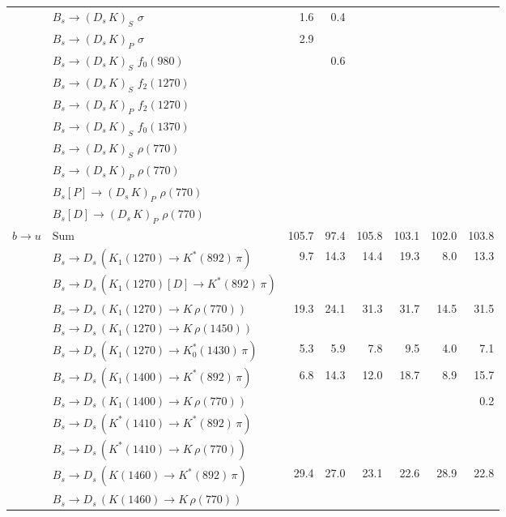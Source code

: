 \begin{tabular}{l l  r  r  r  r  r  r  }
 & $B_s \to ( D_s \, K)_{S} \, \, \sigma$ & 1.6 & 0.4 &  &  &  &  \\ 
 & $B_s \to ( D_s \, K)_{P} \, \, \sigma$ & 2.9 &  &  &  &  &  \\ 
 & $B_s \to ( D_s \, K)_{S} \, \, f_0(980)$ &  & 0.6 &  &  &  &  \\ 
 & $B_s \to ( D_s \, K)_{S} \, \, f_2(1270)$ &  &  &  &  &  &  \\ 
 & $B_s \to ( D_s \, K)_{P} \, \, f_2(1270)$ &  &  &  &  &  &  \\ 
 & $B_s \to ( D_s \, K)_{S} \, \, f_0(1370)$ &  &  &  &  &  &  \\ 
 & $B_s \to ( D_s \, K)_{S} \, \, \rho(770)$ &  &  &  &  &  &  \\ 
 & $B_s \to ( D_s \, K)_{P} \, \, \rho(770)$ &  &  &  &  &  &  \\ 
 & $B_s[P] \to ( D_s \, K)_{P} \, \, \rho(770)$ &  &  &  &  &  &  \\ 
 & $B_s[D] \to ( D_s \, K)_{P} \, \, \rho(770)$ &  &  &  &  &  &  \\ 
\multirow{30}{*}{$b \to u$}  & $\text{Sum}$ & 105.7 & 97.4 & 105.8 & 103.1 & 102.0 & 103.8 \\ 
\hline
 & $B_s \to D_s \, ( K_1(1270) \to K^{*}(892) \, \pi )$ & 9.7 & 14.3 & 14.4 & 19.3 & 8.0 & 13.3 \\ 
 & $B_s \to D_s \, ( K_1(1270)[D] \to K^{*}(892) \, \pi )$ &  &  &  &  &  &  \\ 
 & $B_s \to D_s \, ( K_1(1270) \to K \, \rho(770) )$ & 19.3 & 24.1 & 31.3 & 31.7 & 14.5 & 31.5 \\ 
 & $B_s \to D_s \, ( K_1(1270) \to K \, \rho(1450) )$ &  &  &  &  &  &  \\ 
 & $B_s \to D_s \, ( K_1(1270) \to K^{*}_{0}(1430) \, \pi )$ & 5.3 & 5.9 & 7.8 & 9.5 & 4.0 & 7.1 \\ 
 & $B_s \to D_s \, ( K_1(1400) \to K^{*}(892) \, \pi )$ & 6.8 & 14.3 & 12.0 & 18.7 & 8.9 & 15.7 \\ 
 & $B_s \to D_s \, ( K_1(1400) \to K \, \rho(770) )$ &  &  &  &  &  & 0.2 \\ 
 & $B_s \to D_s \, ( K^{*}(1410) \to K^{*}(892) \, \pi )$ &  &  &  &  &  &  \\ 
 & $B_s \to D_s \, ( K^{*}(1410) \to K \, \rho(770) )$ &  &  &  &  &  &  \\ 
 & $B_s \to D_s \, ( K(1460) \to K^{*}(892) \, \pi )$ & 29.4 & 27.0 & 23.1 & 22.6 & 28.9 & 22.8 \\ 
 & $B_s \to D_s \, ( K(1460) \to K \, \rho(770) )$ &  &  &  &  &  &  \\ 

\end{tabular}
